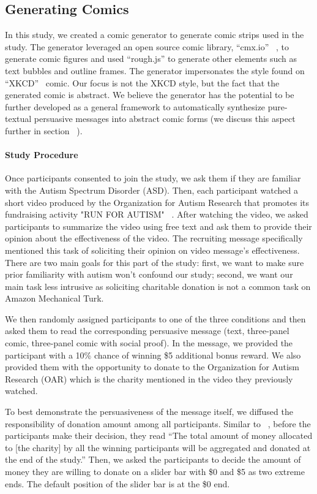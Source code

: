 \subsection{Generating Comics}
In this study, we created a comic generator to generate comic strips used in the study. The generator leveraged an open source comic library, ``cmx.io'' ~\cite{cmx.io}, to generate comic figures and used ``rough.js'' \cite{rough.js} to generate other elements such as text bubbles and outline frames. The generator impersonates the style found on ``XKCD''~\cite{munroe2009xkcd} comic. Our focus is not the XKCD style, but the fact that the generated comic is abstract. We believe the generator has the potential to be further developed as a general framework to automatically synthesize pure-textual persuasive messages into abstract comic forms (we discuss this aspect further in section ~).

\paragraph{Study Procedure} 
Once participants consented to join the study, we ask them if they are familiar with the Autism Spectrum Disorder (ASD). Then, each participant watched a short video produced by the Organization for Autism Research that promotes its fundraising activity "RUN FOR AUTISM" ~\cite{youtube_research}. After watching the video, we asked participants to summarize the video using free text and ask them to provide their opinion about the effectiveness of the video. The recruiting message specifically mentioned this task of soliciting their opinion on video message's effectiveness. There are two main goals for this part of the study: first, we want to make sure prior familiarity with autism won't confound our study; second, we want our main task less intrusive as soliciting charitable donation is not a common task on Amazon Mechanical Turk.  

We then randomly assigned participants to one of the three conditions and then asked them to read the corresponding persuasive message (text, three-panel comic, three-panel comic with social proof). In the message, we provided the participant with a 10\% chance of winning \$5 additional bonus reward. We also provided them with the opportunity to donate to the Organization for Autism Research (OAR) which is the charity mentioned in the video they previously watched.

To best demonstrate the persuasiveness of the message itself, we diffused the responsibility of donation amount among all participants. Similar to ~\textcite{lee2013does}, before the participants make their decision, they read ``The total amount of money allocated to [the charity] by all the winning participants will be aggregated and donated at the end of the study.'' Then, we asked the participants to decide the amount of money they are willing to donate on a slider bar with \$0 and \$5 as two extreme ends. The default position of the slider bar is at the \$0 end.

